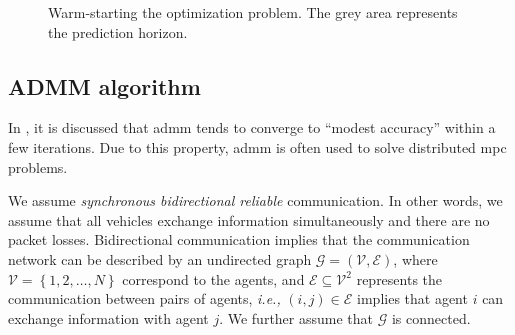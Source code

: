 \begin{figure}[!htbp]
    \centering
    
    
    \caption{Warm-starting the optimization problem. The grey area represents the prediction horizon.}
    \label{fig:MPC_warm_start}
\end{figure}



\subsection{ADMM algorithm}



In \cite{boyd_2011_distributed}, it is discussed that \gls{admm} tends to converge to ``modest accuracy'' within a few iterations.
Due to this property, \gls{admm} is often used to solve distributed \gls{mpc} problems.

We assume \emph{synchronous bidirectional reliable} communication.
In other words, we assume that all vehicles exchange information simultaneously and there are no packet losses.
Bidirectional communication implies that the communication network can be described by an undirected graph $\mathcal{G} = \left(\mathcal{V}, \mathcal{E}\right)$, where $\mathcal{V} = \left\{1, 2, \ldots, N\right\}$ correspond to the agents, and $\mathcal{E} \subseteq \mathcal{V}^2$ represents the communication between pairs of agents, \emph{i.e.,} $(i,j) \in \mathcal{E}$ implies that agent $i$ can exchange information with agent $j$. We further assume that $\mathcal{G}$ is connected.

